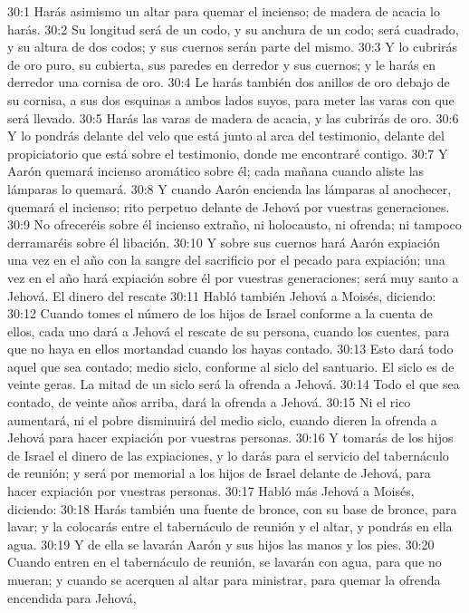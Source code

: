 30:1 Harás asimismo un altar para quemar el incienso; de madera de acacia lo harás. 
30:2 Su longitud será de un codo, y su anchura de un codo; será cuadrado, y su altura de dos codos; y sus cuernos serán parte del mismo. 
30:3 Y lo cubrirás de oro puro, su cubierta, sus paredes en derredor y sus cuernos; y le harás en derredor una cornisa de oro. 
30:4 Le harás también dos anillos de oro debajo de su cornisa, a sus dos esquinas a ambos lados suyos, para meter las varas con que será llevado. 
30:5 Harás las varas de madera de acacia, y las cubrirás de oro. 
30:6 Y lo pondrás delante del velo que está junto al arca del testimonio, delante del propiciatorio que está sobre el testimonio, donde me encontraré contigo. 
30:7 Y Aarón quemará incienso aromático sobre él; cada mañana cuando aliste las lámparas lo quemará. 
30:8 Y cuando Aarón encienda las lámparas al anochecer, quemará el incienso; rito perpetuo delante de Jehová por vuestras generaciones. 
30:9 No ofreceréis sobre él incienso extraño, ni holocausto, ni ofrenda; ni tampoco derramaréis sobre él libación. 
30:10 Y sobre sus cuernos hará Aarón expiación una vez en el año con la sangre del sacrificio por el pecado para expiación; una vez en el año hará expiación sobre él por vuestras generaciones; será muy santo a Jehová. 
El dinero del rescate 
30:11 Habló también Jehová a Moisés, diciendo: 
30:12 Cuando tomes el número de los hijos de Israel conforme a la cuenta de ellos, cada uno dará a Jehová el rescate de su persona, cuando los cuentes, para que no haya en ellos mortandad cuando los hayas contado. 
30:13 Esto dará todo aquel que sea contado; medio siclo,  conforme al siclo del santuario. El siclo es de veinte geras. La mitad de un siclo será la ofrenda a Jehová. 
30:14 Todo el que sea contado, de veinte años arriba, dará la ofrenda a Jehová. 
30:15 Ni el rico aumentará, ni el pobre disminuirá del medio siclo, cuando dieren la ofrenda a Jehová para hacer expiación por vuestras personas. 
30:16 Y tomarás de los hijos de Israel el dinero de las expiaciones, y lo darás para el servicio del tabernáculo de reunión; y será por memorial a los hijos de Israel delante de Jehová, para hacer expiación por vuestras personas. 
30:17 Habló más Jehová a Moisés, diciendo: 
30:18 Harás también una fuente de bronce, con su base de bronce, para lavar; y la colocarás entre el tabernáculo de reunión y el altar, y pondrás en ella agua. 
30:19 Y de ella se lavarán Aarón y sus hijos las manos y los pies. 
30:20 Cuando entren en el tabernáculo de reunión, se lavarán con agua, para que no mueran; y cuando se acerquen al altar para ministrar, para quemar la ofrenda encendida para Jehová, 
